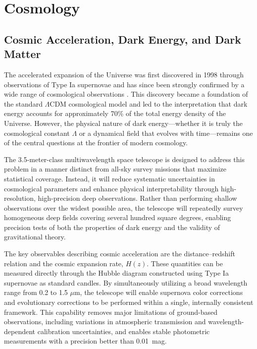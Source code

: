 \section{Cosmology}\label{cosmology}

\subsection{Cosmic Acceleration, Dark Energy, and Dark Matter}\label{cosmic-acceleration-dark-energy-and-dark-matter}

The accelerated expansion of the Universe was first discovered in 1998 through observations of Type Ia supernovae and has since been strongly confirmed by a wide range of cosmological observations \cite{riess98,perlmutter99}. This discovery became a foundation of the standard $\Lambda$CDM cosmological model and led to the interpretation that dark energy accounts for approximately 70\% of the total energy density of the Universe. However, the physical nature of dark energy---whether it is truly the cosmological constant $\Lambda$ or a dynamical field that evolves with time---remains one of the central questions at the frontier of modern cosmology.

The 3.5-meter-class multiwavelength space telescope is designed to address this problem in a manner distinct from all-sky survey missions that maximize statistical coverage. Instead, it will reduce systematic uncertainties in cosmological parameters and enhance physical interpretability through high-resolution, high-precision deep observations. Rather than performing shallow observations over the widest possible area, the telescope will repeatedly survey homogeneous deep fields covering several hundred square degrees, enabling precision tests of both the properties of dark energy and the validity of gravitational theory.

The key observables describing cosmic acceleration are the distance--redshift relation and the cosmic expansion rate, $H(z)$. These quantities can be measured directly through the Hubble diagram constructed using Type Ia supernovae as standard candles. By simultaneously utilizing a broad wavelength range from 0.2 to 1.5 $\mu$m, the telescope will enable supernova color corrections and evolutionary corrections to be performed within a single, internally consistent framework. This capability removes major limitations of ground-based observations, including variations in atmospheric transmission and wavelength-dependent calibration uncertainties, and enables stable photometric measurements with a precision better than 0.01~mag.

